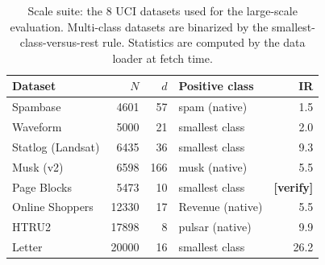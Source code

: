 \begin{table}[t]
\centering
\caption{Scale suite: the 8 UCI datasets used for the large-scale evaluation. Multi-class datasets are binarized by the smallest-class-versus-rest rule. Statistics are computed by the data loader at fetch time.}
\label{tab:scale}
\footnotesize
\setlength{\tabcolsep}{6pt}
\begin{tabular}{@{}lrrlr@{}}
\toprule
Dataset & $N$ & $d$ & Positive class & IR\\
\midrule
Spambase & 4601 & 57 & spam (native) & 1.5 \\
Waveform & 5000 & 21 & smallest class & 2.0 \\
Statlog (Landsat) & 6435 & 36 & smallest class & 9.3 \\
Musk (v2) & 6598 & 166 & musk (native) & 5.5 \\
Page Blocks & 5473 & 10 & smallest class & \textbf{[verify]} \\
Online Shoppers & 12330 & 17 & Revenue (native) & 5.5 \\
HTRU2 & 17898 & 8 & pulsar (native) & 9.9 \\
Letter & 20000 & 16 & smallest class & 26.2 \\
\bottomrule
\end{tabular}
\end{table}
